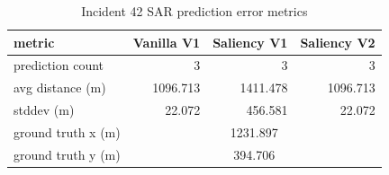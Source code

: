 \begin{table}[ht]
\centering
\caption{Incident 42 SAR prediction error metrics}
\label{tab:sar-incident-42}
\begin{tabular}{lrrr}
\hline
metric & Vanilla V1 & Saliency V1 & Saliency V2 \\
\hline
prediction count & 3 & 3 & 3 \\
avg distance (m) & 1096.713 & 1411.478 & 1096.713 \\
stddev (m) & 22.072 & 456.581 & 22.072 \\
ground truth x (m) & \multicolumn{3}{c}{1231.897} \\
ground truth y (m) & \multicolumn{3}{c}{394.706} \\
\hline
\end{tabular}
\end{table}
